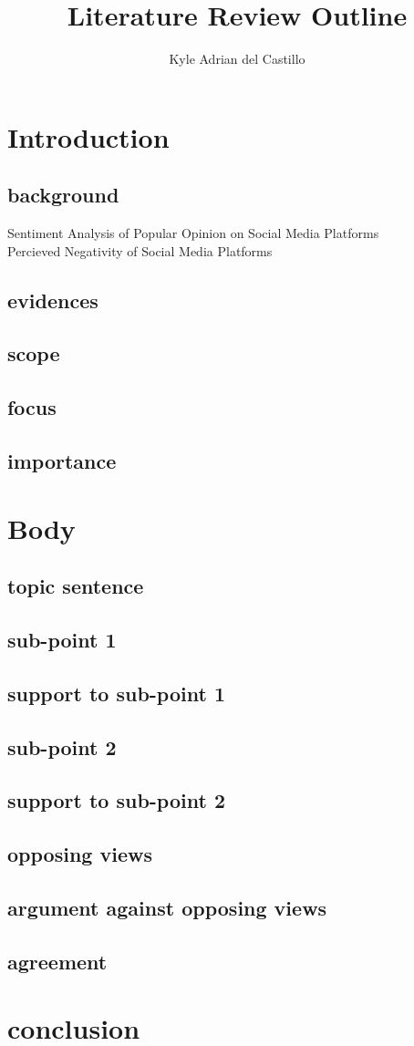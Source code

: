 \documentclass{article}
\title{Literature Review Outline}
\author{Kyle Adrian del Castillo}
\begin{document}
\maketitle


\section{Introduction}
\subsection*{background}
Sentiment Analysis of Popular Opinion on Social Media Platforms\\
Percieved Negativity of Social Media Platforms
\subsection*{evidences}
\subsection*{scope}
\subsection*{focus}
\subsection*{importance}


\section{Body}
\subsection*{topic sentence}

\subsection*{sub-point 1}
\subsection*{support to sub-point 1}

\subsection*{sub-point 2}
\subsection*{support to sub-point 2}

\subsection*{opposing views}

\subsection*{argument against opposing views}

\subsection*{agreement}


\section{conclusion}
\end{document}
